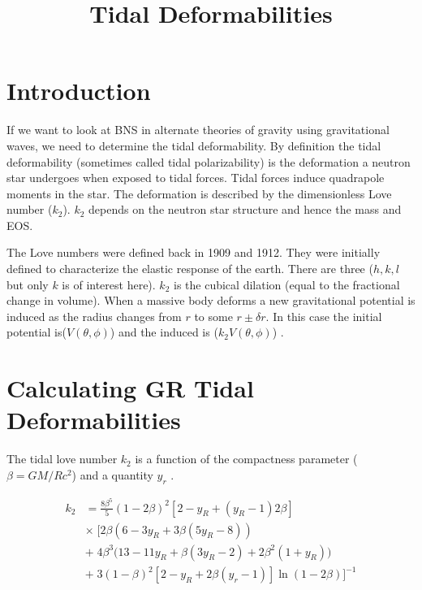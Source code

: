 \documentclass[11pt]{article}
\title{Tidal Deformabilities}
\numberwithin{equation}{section}
\begin{document}
 

\maketitle 

\section{Introduction}



If we want to look at BNS in alternate theories of gravity using gravitational waves, we need to determine the tidal deformability.  By definition the tidal deformability (sometimes called tidal polarizability) is the deformation a neutron star undergoes when exposed to tidal forces. Tidal forces induce quadrapole moments in the star.  The deformation is described by the dimensionless Love number ($k_2$).  $k_2$ depends on the neutron star structure and hence the mass and EOS.

The Love numbers were defined back in 1909 and 1912.  They were initially defined to characterize the elastic response of the earth. There are three ($h,k,l$ but only $k$ is of interest here).  $k_2$ is the cubical dilation (equal to the fractional change in volume).  When a massive body deforms a new gravitational potential is induced as the radius changes from $r$ to some $r \pm \delta r$.  In this case the initial potential  is($V(\theta,\phi)$) and the induced is ($k_{2}V(\theta,\phi)$) \cite{Agnew_2007}.  

\section{Calculating GR Tidal Deformabilities}

The tidal love number $k_2$ is a function of the compactness parameter ($\beta = GM/Rc^2$) and a quantity $y_r$ \cite{Moustakidis_2017, Hinderer_2008, Chirenti_2020}.  

\begin{align*}
k_{2} &=  \frac{8 \beta^{5}}{5}(1-2\beta)^{2} [2 - y_{R} + (y_{R} - 1) 2 \beta]  \\
	& \times \; \bigg[ 2 \beta (6-3 y_{R} + 3 \beta(5 y_{R} -8)) \\
	& + \; 4 \beta^{3} \big(13-11 y_{R} + \beta(3 y_{R} -2) + 2 \beta^{2} (1+y_{R}) \big) \\
	& + \; 3 (1-\beta)^{2} [2-y_{R}+2 \beta(y_{r}-1)] \ln (1-2 \beta) \bigg] ^{-1}
\end{align*}
\end{document}

